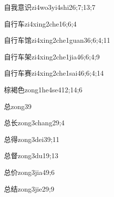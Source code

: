 \begin{verbete}{自我意识}{zi4wo3yi4shi2}{6;7;13;7}
\end{verbete}

\begin{verbete}{自行车}{zi4xing2che1}{6;6;4}
\end{verbete}

\begin{verbete}{自行车馆}{zi4xing2che1guan3}{6;6;4;11}
\end{verbete}

\begin{verbete}{自行车架}{zi4xing2che1jia4}{6;6;4;9}
\end{verbete}

\begin{verbete}{自行车赛}{zi4xing2che1sai4}{6;6;4;14}
\end{verbete}

\begin{verbete}{棕褐色}{zong1he4se4}{12;14;6}
\end{verbete}

\begin{verbete}{总}{zong3}{9}
\end{verbete}

\begin{verbete}{总长}{zong3chang2}{9;4}
\end{verbete}

\begin{verbete}{总得}{zong3dei3}{9;11}
\end{verbete}

\begin{verbete}{总督}{zong3du1}{9;13}
\end{verbete}

\begin{verbete}{总价}{zong3jia4}{9;6}
\end{verbete}

\begin{verbete}{总结}{zong3jie2}{9;9}
\end{verbete}

